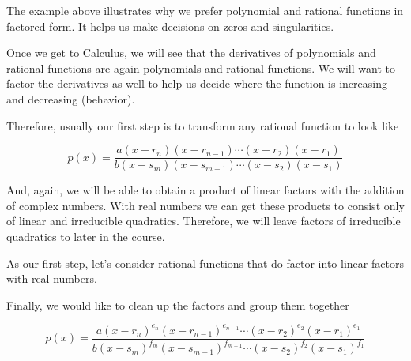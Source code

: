 \documentclass{ximera}
\begin{document}
The example above illustrates why we prefer polynomial and rational functions in factored form.  It helps us make decisions on zeros and singularities. 

Once we get to Calculus, we will see that the derivatives of polynomials and rational functions are again polynomials and rational functions. We will want to factor the derivatives as well to help us decide where the function is increasing and decreasing (behavior). 




Therefore, usually our first step is to transform any rational function to look like



\[ p(x) =   \frac{ a (x-r_n)(x-r_{n-1})  \cdots (x-r_2)(x-r_1)  } { b (x-s_m)(x-s_{m-1})  \cdots (x-s_2)(x-s_1) }   \]




And, again, we will be able to obtain a product of linear factors with the addition of complex numbers.  With real numbers we can get these products to consist only of linear and irreducible quadratics.  Therefore, we will leave factors of irreducible quadratics to later in the course. 

As our first step, let's consider rational functions that do factor into linear factors with real numbers. 




Finally, we would like to clean up the factors and group them together






\[ p(x) =   \frac{ a (x-r_n)^{e_n} (x-r_{n-1})^{e_{n-1}}  \cdots (x-r_2)^{e_2} (x-r_1)^{e_1}  } { b (x-s_m)^{f_m} (x-s_{m-1})^{f_{m-1}}  \cdots (x-s_2)^{f_2} (x-s_1)^{f_1} }   \]
\end{document}
